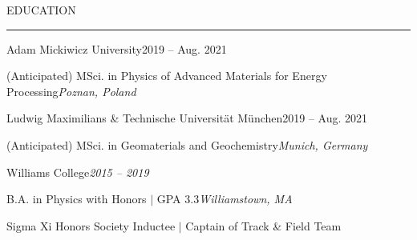\documentclass{short_resume} %
\renewenvironment{rSection}[1]{
	\sectionskip
	\textcolor{RoyalPurple}{\MakeUppercase{#1}}
	\sectionlineskip
	\hrule
	\begin{list}{}{
			\setlength{\leftmargin}{1.5em}
		}
		\item[]
	}{
	\end{list}
}
\begin{document}
\begin{rSection}{Education}
		\begin{rSubsection}{Adam Mickiwicz University}{2019 -- Aug. 2021}{}{}
			\vspace{-.2em}
			\item[] {(Anticipated) MSci. in Physics of Advanced Materials for Energy Processing}\hfill{\em Poznan, Poland}
		\end{rSubsection}
	\vspace{-.5em}
		\begin{rSubsection}{Ludwig Maximilians \& Technische Universit{\"a}t M{\"u}nchen}{2019 -- Aug. 2021}{}{}
		\vspace{-.2em}
		\item[] {(Anticipated) MSci. in Geomaterials and Geochemistry}\hfill{\em Munich, Germany}
		\end{rSubsection}
	\vspace{-.4em}
		\begin{rSubsection}{Williams College}{\em 2015 -- 2019}{}{}
			\vspace{-.2em}
			\item[] {B.A. in Physics with Honors $\vert$ GPA 3.3}\hfill{\em Williamstown, MA}
			\item[] Sigma Xi Honors Society Inductee $\vert$ Captain of Track \& Field Team	
		\end{rSubsection}
	\end{rSection}
		
\end{document}
